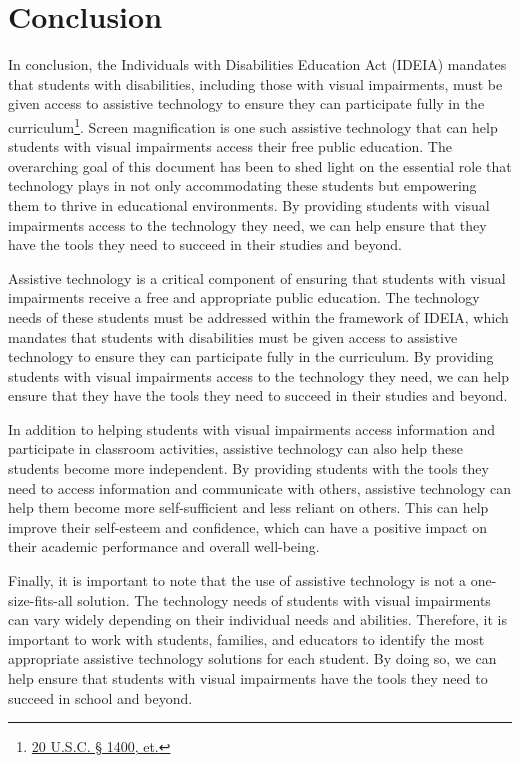 \chapter{Conclusion}\label{main-conclusion}
In conclusion, the Individuals with Disabilities Education Act (IDEIA) mandates that students with disabilities, including those with visual impairments, must be given access to assistive technology to ensure they can participate fully in the curriculum\footnote{\raggedright \href{http://sites.ed.gov/idea/statuteregulations/}{20 U.S.C. § 1400, et.}}. Screen magnification is one such assistive technology that can help students with visual impairments access their free public education. The overarching goal of this document has been to shed light on the essential role that technology plays in not only accommodating these students but empowering them to thrive in educational environments. By providing students with visual impairments access to the technology they need, we can help ensure that they have the tools they need to succeed in their studies and beyond.

Assistive technology is a critical component of ensuring that students with visual impairments receive a free and appropriate public education. The technology needs of these students must be addressed within the framework of IDEIA, which mandates that students with disabilities must be given access to assistive technology to ensure they can participate fully in the curriculum. By providing students with visual impairments access to the technology they need, we can help ensure that they have the tools they need to succeed in their studies and beyond.

In addition to helping students with visual impairments access information and participate in classroom activities, assistive technology can also help these students become more independent. By providing students with the tools they need to access information and communicate with others, assistive technology can help them become more self-sufficient and less reliant on others. This can help improve their self-esteem and confidence, which can have a positive impact on their academic performance and overall well-being.

Finally, it is important to note that the use of assistive technology is not a one-size-fits-all solution. The technology needs of students with visual impairments can vary widely depending on their individual needs and abilities. Therefore, it is important to work with students, families, and educators to identify the most appropriate assistive technology solutions for each student. By doing so, we can help ensure that students with visual impairments have the tools they need to succeed in school and beyond.

